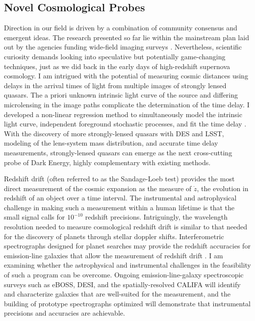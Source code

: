 \documentclass{article}
\begin{document}
\subsection{Novel Cosmological Probes}
Direction in our field is driven by a combination of community consensus and emergent ideas.
The research presented so far  lie  within the
mainstream plan laid out by the agencies funding wide-field imaging surveys
\cite{2013arXiv1309.5386D,2013arXiv1309.5382K}.
Nevertheless, scientific curiosity demands looking into speculative but potentially game-changing
techniques, just as we did back in the early days of high-redshift supernova cosmology.
I am intrigued with the potential of measuring cosmic distances using delays in the arrival times of light from multiple images
of strongly lensed quasars.  The a priori unknown intrinsic light curve of the source and differing microlensing
in the image paths complicate the determination of the time delay.  I developed a
non-linear regression method to simultaneously model the intrinsic light curve, independent foreground
stochastic processes, and fit the time delay \cite{2013PhRvD..87l3512H}.  With the discovery of more 
strongly-lensed quasars with DES and LSST, modeling of the lens-system mass distribution, and accurate
time delay measurements, strongly-lensed
quasars can emerge as the next cross-cutting probe of Dark Energy, highly complementary with existing methods.

Redshift drift (often referred to as the Sandage-Loeb test) provides the most direct  measurement
of the cosmic expansion as the measure of $\dot{z}$, the evolution in redshift of an object over a time interval.
The instrumental
and astrophysical challenge
in making such a measurement within a human lifetime
is that the small signal calls for $10^{-10}$ redshift precisions.  Intriguingly, the wavelength resolution needed to measure
cosmological redshift drift is similar to that needed for the discovery of planets through stellar doppler shifts.
Interferometric spectrographs designed for planet searches may provide the redshift accuracies for emission-line galaxies
that allow the measurement of redshift drift
\cite{drift}.
I  am examining whether the astrophysical and instrumental challenges in the feasibility of such a program can be overcome.
Ongoing  emission-line-galaxy  spectroscopic surveys such
as eBOSS, DESI, and the spatially-resolved CALIFA will identify and characterize
galaxies that are well-suited for the measurement, and the building of prototype spectrographs optimized will demonstrate that
instrumental precisions and accuracies are achievable.
\end{document}
